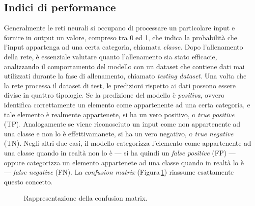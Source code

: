 \subsection{Indici di performance}
% 
Generalmente le reti neurali si occupano di processare un particolare input e fornire in output un valore, compreso tra 0 ed 1, che indica la probabilità che l'input appartenga ad una certa categoria, chiamata \textsl{classe}. Dopo l'allenamento della rete, è essenziale valutare quanto l'allenamento sia stato efficacie, analizzando il comportamento del modello con un dataset che contiene dati mai utilizzati durante la fase di allenamento, chiamato \textit{testing dataset}. Una volta che la rete processa il dataset di test, le predizioni rispetto ai dati possono essere divise in quattro tipologie. Se la predizione del modello è \textsl{positiva}, ovvero identifica correttamente un elemento come appartenente ad una certa categoria, e tale elemento è realmente appartenete, si ha un vero positivo, o \textit{true positive} (TP). Analogamente se viene riconosciuto un input come non appartenente ad una classe e non lo è effettivamanete, si ha un vero negativo, o \textit{true negative} (TN). Negli altri due casi, il modello categorizza l'elemento come appartenente ad una classe quando in realtà non lo è — si ha quindi un \textit{false positive} (FP) — oppure categorizza un elemento appartenete ad una classe quando in realtà lo è — \textit{false negative} (FN). La \textit{confusion matrix} (Figura\,\ref{fig:confusion-matrix}) riassume esattamente questo concetto.
% 
\begin{figure}[!t]
    \centering
    
    \caption[Rappresentazione della confusion matrix.]{Rappresentazione della confusion matrix.}\label{fig:confusion-matrix}
\end{figure}
% 


